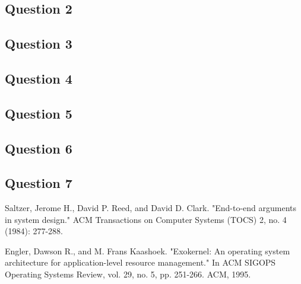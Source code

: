 \documentclass[12pt,a4paper,fleqn]{article}
\begin{document}
\subsection*{Question 2}
\label{sec:pq2}

\subsection*{Question 3}
\label{sec:pq3}

\subsection*{Question 4}
\label{sec:pq4}

\subsection*{Question 5}
\label{sec:pq5}

\subsection*{Question 6}
\label{sec:pq6}

\subsection*{Question 7}
\label{sec:pq7}
 

\begin{thebibliography}{1}

 Saltzer, Jerome H., David P. Reed, and David D. Clark. "End-to-end arguments in system design." ACM Transactions on Computer Systems (TOCS) 2, no. 4 (1984): 277-288.

 Engler, Dawson R., and M. Frans Kaashoek. "Exokernel: An operating system architecture for application-level resource management." In ACM SIGOPS Operating Systems Review, vol. 29, no. 5, pp. 251-266. ACM, 1995.

\end{thebibliography}
\end{document}
